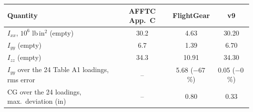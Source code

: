 \begin{tabular}{lccc}
\toprule
Quantity & AFFTC App.~C & FlightGear & v9 \\
\midrule
$I_{xx}$, $10^6$ lb\,in$^2$ (empty) & 30.2 & 4.63 & 30.20 \\
$I_{yy}$ (empty) & 6.7 & 1.39 & 6.70 \\
$I_{zz}$ (empty) & 34.3 & 10.91 & 34.30 \\
$I_{yy}$ over the 24 Table A1 loadings, rms error & -- & 5.68 ($-$67\,\%) & 0.05 ($-$0\,\%) \\
CG over the 24 loadings, max.\ deviation (in) & -- & 0.80 & 0.33 \\
\bottomrule
\end{tabular}
